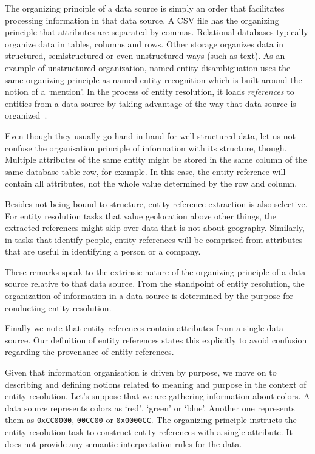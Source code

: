 The organizing principle of a data source is simply an order that
facilitates processing information in that data source.
A CSV file has the organizing principle that attributes are separated by
commas.
Relational databases typically organize data in tables, columns and rows.
Other storage organizes data in structured, semistructured or even
unstructured ways (such as text).
As an example of unstructured organization, named entity disambiguation uses
the same organizing principle as named entity recognition which is built around
the notion of a `mention'.
In the process of entity resolution, it loads \textit{references} to entities
from a data source by taking advantage of the way that data source is
organized~\cite{Ben2009Swoosh}.

Even though they usually go hand in hand for well-structured data, let us not
confuse the organisation principle of information with its structure, though.
Multiple attributes of the same entity might be stored in the same column of the
same database table row, for example.
In this case, the entity reference will contain all attributes, not the whole
value determined by the row and column.

Besides not being bound to structure, entity reference extraction is also
selective.
For entity resolution tasks that value geolocation above other things, the
extracted references might skip over data that is not about geography.
Similarly, in tasks that identify people, entity references will be
comprised from attributes that are useful in identifying a person or a
company.

These remarks speak to the extrinsic nature of the organizing principle of a
data source relative to that data source.
From the standpoint of entity resolution, the organization of information in a
data source is determined by the purpose for conducting entity resolution.

Finally we note that entity references contain attributes from a single data
source.
Our definition of entity references states this explicitly to avoid confusion
regarding the provenance of entity references.

Given that information organisation is driven by purpose, we move on to
describing and defining notions related to meaning and purpose in the context of
entity resolution.
Let's suppose that we are gathering information about colors.
A data source represents colors as `red', `green' or `blue'.
Another one represents them as \texttt{0xCC0000}, \texttt{00CC00} or
\texttt{0x0000CC}.
The organizing principle instructs the entity resolution task to construct
entity references with a single attribute.
It does not provide any semantic interpretation rules for the data.

